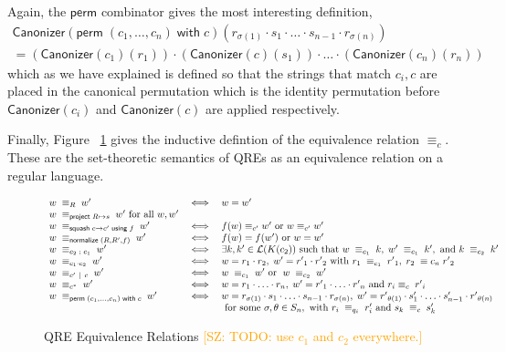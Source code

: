 \documentclass[acmsmall,review,anonymous]{acmart}
\newcommand{\FINISH}[3]{\ifdraft\textcolor{#1}{[#2: #3]}\fi}
\newcommand{\saz}[1]{\FINISH{orange}{SZ}{#1}}
\newcommand{\kw}[1]{\ensuremath{\mathsf{#1}}}
\newcommand{\project}[2]{\ensuremath{\kw{project} \; #1 \mapsto #2}}
\newcommand{\squash}[3]{\ensuremath{\kw{squash} \; #1 \rightarrow #2\; \kw{using} \; #3}}
\newcommand{\perm}[2]{\ensuremath{\kw{perm}\; (#1)\; \kw{with}\; #2}}
\newcommand{\normalize}[3]{\ensuremath{\kw{normalize} \; (#1, #2, #3)}}
\newcommand{\sep}{\ensuremath{\ | \ }}
\newcommand{\canonizer}{\ensuremath{\kw{Canonizer}}}
\newcommand{\eqrel}[1]{\ensuremath{\equiv_{#1}}}
\begin{document}
Again, the \kw{perm} combinator gives the most interesting
definition,
\begin{align*}\canonizer(\perm{c_1, \ldots, c_n}{c})(r_{\sigma(1)}
\cdot s_1 \cdot \ldots \cdot s_{n-1} \cdot r_{\sigma(n)}) \\
= (\canonizer(c_1)(r_1)) \cdot (\canonizer(c)(s_1)) \cdot \ldots \cdot
(\canonizer(c_n)(r_n))
\end{align*}
\noindent which as we have explained is defined so that the strings that match
$c_i, c$ are placed in the canonical permutation which is the identity
permutation before $\canonizer(c_i)$ and $\canonizer(c)$ are applied
respectively.

Finally, Figure ~\ref{fig:relations} gives the inductive defintion of the
equivalence relation $\eqrel{c}$. These are the set-theoretic semantics of QREs
as an equivalence relation on a regular language.

\begin{figure}[t]
\centering
\[
\begin{array}{l@{\quad}l@{\quad}l}
w \; \equiv_R \; w' &\iff& w = w' \\
w \; \equiv_{\project{R}{s}} \; w' \text{ for all }w, w'\\
w \; \equiv_{\squash{c}{c'}{f}} \; w' &\iff& f(w) \equiv_{c'} w'
\text{ or } w \equiv_{c'} w' \\
w \; \equiv_{\normalize{R}{R'}{f}} \; w' &\iff&
f(w)=f(w') \text{ or }w = w'\\
w \; \equiv_{c_2 \; ; \; c_1} \; w' &\iff& \exists k, k' \in
\mathcal{L}(K(c_2)) \text{ such that } w \; \equiv_{c_1} \; k, \; w' \;
\equiv_{c_1} \; k', \text{ and } k \; \equiv_{c_2} \; k'\\
w \; \equiv_{c_1 \cdot c_2} \; w'  &\iff& w = r_1
\cdot r_2, \; w' = {r'}_1 \cdot {r'}_2 \text{ with } r_1 \; \equiv_{c_1}
\; {r'}_1, \; r_2 \; \equiv{c_n} \; {r'}_2\\
w \; \equiv_{c' \sep c} \; w' &\iff& w \; \equiv_{c_1} \; w'
\text{ or } \; w \; \equiv_{c_2} \; w'\\
w \; \equiv_{c^*} \; w' &\iff& w = r_1 \cdot \ldots \cdot r_n, \; w'
= {r'}_1 \cdot \ldots \cdot {r'}_n \text{ and } r_i \equiv_{c} \; {r'}_i
\\
w \; \equiv_{\perm{c_1, \ldots, c_n}{c}} \; w' &\iff& w = r_{\sigma(1)}
\cdot s_1 \cdot \ldots \cdot s_{n-1} \cdot r_{\sigma(n)}, \;
w' = {r'}_{\theta(1)} \cdot s'_1 \cdot \ldots \cdot s'_{n-1}
\cdot {r'}_{\theta(n)} \\
& & \text{ for some } \sigma, \theta \in S_n, \text{ with } r_i \;
\equiv_{q_i} \; r'_i \text{ and } s_k \; \equiv_{c} \; s'_{k}
\end{array}
\]
\caption{QRE Equivalence Relations \saz{TODO: use $c_1$ and $c_2$ everywhere.}}
\label{fig:relations}
\end{figure}
\end{document}
